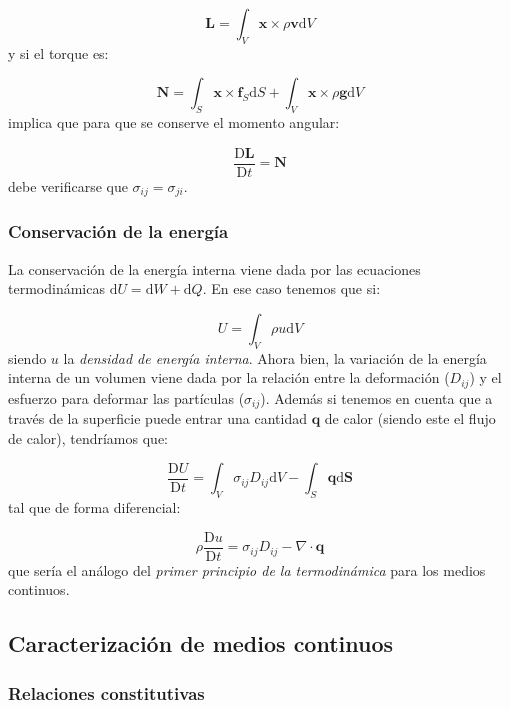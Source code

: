 \documentclass[12pt,a4paper]{article}
\numberwithin{equation}{section}
\numberwithin{figure}{section}
\newcommand{\D}{\mathrm{d}}
\newcommand{\Dd}{\mathrm{D}}
\newcommand{\vn}{\mathbf{v}}
\newcommand{\xn}{\mathbf{x}}
\newcommand{\qn}{\mathbf{q}}
\newcommand{\gn}{\mathbf{g}}
\newcommand{\Sn}{\mathbf{S}}
\newcommand{\fn}{\mathbf{f}}
\newcommand{\Ln}{\mathbf{L}}
\newcommand{\Nn}{\mathbf{N}}
\begin{document}
\begin{equation}
\Ln = \int_V \xn \times \rho \vn \D V
\end{equation}
y si el torque es:

\begin{equation}
\Nn = \int_S \xn \times \fn_S \D S + \int_V \xn \times \rho \gn \D V
\end{equation}
implica que para que se conserve el momento angular:

\begin{equation}
\dfrac{\Dd \Ln}{\Dd t} = \Nn
\end{equation}
debe verificarse que $\sigma_{ij}=\sigma_{ji}$. 

\subsubsection{Conservación de la energía}

La conservación de la energía interna viene dada por las ecuaciones termodinámicas $\D U =\D W + \D Q$. En ese caso tenemos que si:

\begin{equation}
U = \int_V \rho u \D V
\end{equation}
siendo $u$ la \textit{densidad de energía interna}. Ahora bien, la variación de la energía interna de un volumen viene dada por la relación entre la deformación ($D_{ij}$) y el esfuerzo para deformar las partículas  ($\sigma_{ij}$). Además si tenemos en cuenta que a través de la superficie puede entrar una cantidad $\qn$ de calor (siendo este el flujo de calor), tendríamos que:

\begin{equation}
\dfrac{\Dd U}{\Dd t} = \int_V \sigma_{ij} D_{ij} \D V - \int_S \qn \D \Sn
\end{equation}
tal que de forma diferencial:


\begin{equation}
\rho \dfrac{\Dd u}{\Dd t} = \sigma_{ij} D_{ij} - \nabla \cdot \qn
\end{equation}
que sería el análogo del \textit{primer principio de la termodinámica} para los medios continuos. 



\subsection{Caracterización de medios continuos}


\subsubsection{Relaciones constitutivas}
\end{document}
